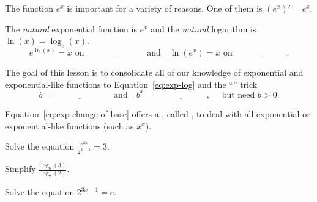 \documentclass[../main.tex]{subfiles}
\begin{document}
The function \(e^{x}\) is important for a variety of reasons. One of them is \((e^{x})' = e^{x}\). 
\begin{mdframed}[style=simple-compact]
  The \emph{natural} exponential function is \(e^{x}\) and the \emph{natural} logarithm is \(\ln(x) = \log_{e}(x)\).
  \begin{equation} \label{eq:exp-log}
    e^{\ln(x)} = x \text{ on } \underline{\hspace{1in}} \quad\text{and}\quad \ln(e^{x}) = x \text{ on } \underline{\hspace{1in}}.
  \end{equation}

  The goal of this lesson is to consolidate all of our knowledge of exponential and exponential-like functions to Equation~\eqref{eq:exp-log} and the ``'' trick
  \begin{equation} \label{eq:exp-change-of-base}
    b = \underline{\hspace{1in}} \quad\text{and}\quad b^{x} = \underline{\hspace{1in}}, \quad\text{ but need } b > 0.
  \end{equation}
\end{mdframed}
\faStar{} Equation~\eqref{eq:exp-change-of-base} offers a , called , to deal with all exponential or exponential-like functions (such as \(x^{x}\)). 


\clearpage

%

\begin{example}
  Solve the equation \(\frac{e^{2x}}{2^{x-1}} = 3\). 

\end{example}

\begin{example}
  Simplify \(\frac{\log_{6}(3)}{\log_{7}(2)}\).

\end{example}

\begin{exercise}
  Solve the equation \(2^{3x - 1} = e\).

\end{exercise}
\end{document}
